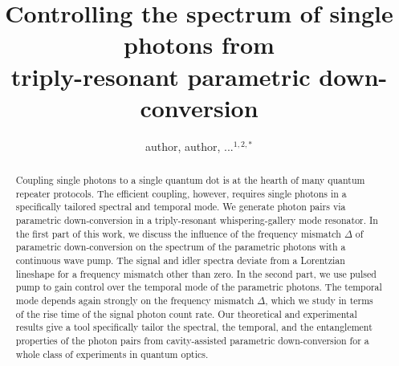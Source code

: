 \documentclass[aps,pra,showpacs,reprint,onecolumn,notitlepage]{revtex4-1}
\begin{document}
\title{Controlling the spectrum of single photons from\\ triply-resonant parametric down-conversion}
\author{author, author, ...$^{1,2,*}$}


\begin{abstract}
Coupling single photons to a single quantum dot is at the hearth of many quantum repeater protocols. The efficient coupling, however, requires single photons in a specifically tailored spectral and temporal mode. We generate photon pairs via parametric down-conversion in a triply-resonant whispering-gallery mode resonator. In the first part of this work, we discuss the influence of the frequency mismatch $\Delta$ of parametric down-conversion on the spectrum of the parametric photons with a continuous wave pump. The signal and idler spectra deviate from a Lorentzian lineshape for a frequency mismatch other than zero.  In the second part, we use pulsed pump to gain control over the temporal mode of the parametric photons. The temporal mode depends again strongly on the frequency mismatch $\Delta$, which we study in terms of the rise time of the signal photon count rate. Our theoretical and experimental results give a tool specifically tailor the spectral, the temporal, and the entanglement properties of the photon pairs from cavity-assisted parametric down-conversion for a whole class of experiments in quantum optics.
\end{abstract}
\end{document}
